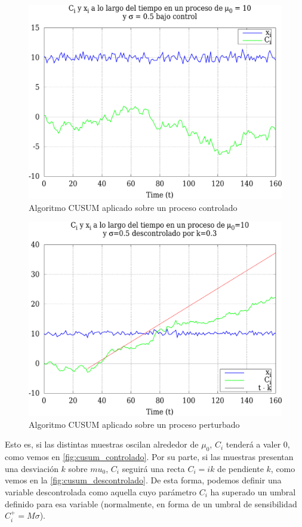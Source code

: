 \begin{figure}[htbp]
\includegraphics[width=\columnwidth]{CapituloCusum/Figuras/ejemploCusumControlado_crop}
\caption{Algoritmo CUSUM aplicado sobre un proceso controlado}
\label{fig:cusum_controlado} 
\end{figure}

\begin{figure}[htbp]
\includegraphics[width=\columnwidth]{CapituloCusum/Figuras/cusumDescontrolado-crop}
\caption{Algoritmo CUSUM aplicado sobre un proceso perturbado}
\label{fig:cusum_descontrolado} 
\end{figure}

Esto es, si las distintas muestras oscilan alrededor de $\mu_0$, $C_i$ tenderá a valer 0, %
como vemos en \autoref{fig:cusum_controlado}. Por su parte, si las muestras presentan 
una desviación $k$ sobre $mu_0$, $C_i$ seguirá una recta $C_i=ik$ de pendiente $k$, 
como vemos en la \autoref{fig:cusum_descontrolado}. De esta forma, podemos definir una
variable descontrolada como aquella cuyo parámetro
$C_i$ ha superado un umbral definido para esa variable (normalmente, en forma de un
umbral de sensibilidad $C_i^+=M\sigma$).

